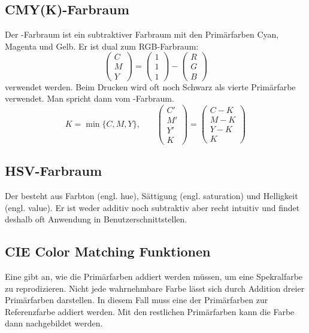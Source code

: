 \subsection{CMY(K)-Farbraum}
Der -Farbraum ist ein subtraktiver Farbraum mit den Primärfarben Cyan, Magenta und Gelb.
Er ist dual zum RGB-Farbraum:
\[
	\begin{pmatrix}
		C \\
		M \\
		Y
	\end{pmatrix}
	=
	\begin{pmatrix}
		1 \\
		1 \\
		1
	\end{pmatrix}
	 -
	\begin{pmatrix}
		R \\
		G \\
		B
	\end{pmatrix}
\]
verwendet werden.
Beim Drucken wird oft noch Schwarz als vierte Primärfarbe verwendet.
Man spricht dann vom -Farbraum.
\[
	K = \min\{C, M, Y\} \text{,} \qquad
	\begin{pmatrix}
		C' \\
		M' \\
		Y' \\
		K
	\end{pmatrix}
	=
	\begin{pmatrix}
		C - K \\
		M - K \\
		Y - K \\
		K
	\end{pmatrix}
\]

\subsection{HSV-Farbraum}
Der  besteht aus Farbton (engl. hue), Sättigung (engl. saturation) und Helligkeit (engl. value).
Er ist weder additiv noch subtraktiv aber recht intuitiv und findet deshalb oft Anwendung in Benutzerschnittstellen.

\subsection{CIE Color Matching Funktionen}
Eine  gibt an, wie die Primärfarben addiert werden müssen, um eine Spekralfarbe zu reprodizieren.
Nicht jede wahrnehmbare Farbe lässt sich durch Addition dreier Primärfarben darstellen.
In diesem Fall muss eine der Primärfarben zur Referenzfarbe addiert werden.
Mit den restlichen Primärfarben kann die Farbe dann nachgebildet werden.

